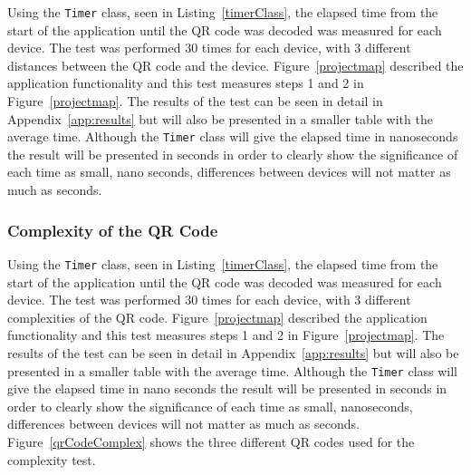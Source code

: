 Using the \texttt{Timer} class, seen in Listing~\ref{timerClass}, the elapsed time from the start of the application until the QR code was decoded was measured for each device. The test was performed 30 times for each device, with 3 different distances between the QR code and the device. Figure~\ref{projectmap} described the application functionality and this test measures steps 1 and 2 in Figure~\ref{projectmap}. The results of the test can be seen in detail in Appendix~\ref{app:results} but will also be presented in a smaller table with the average time. 
Although the \texttt{Timer} class will give the elapsed time in nanoseconds the result will be presented in seconds in order to clearly show the significance of each time as small, nano seconds, differences between devices will not matter as much as seconds.

%       
%		

\subsubsection{Complexity of the QR Code}

Using the \texttt{Timer} class, seen in Listing~\ref{timerClass}, the elapsed time from the start of the application until the QR code was decoded was measured for each device. The test was performed 30 times for each device, with 3 different complexities of the QR code. Figure~\ref{projectmap} described the application functionality and this test measures steps 1 and 2 in Figure~\ref{projectmap}. The results of the test can be seen in detail in Appendix~\ref{app:results} but will also be presented in a smaller table with the average time.
Although the \texttt{Timer} class will give the elapsed time in nano seconds the result will be presented in seconds in order to clearly show the significance of each time as small, nanoseconds, differences between devices will not matter as much as seconds. Figure~\ref{qrCodeComplex} shows the three different QR codes used for the complexity test.

